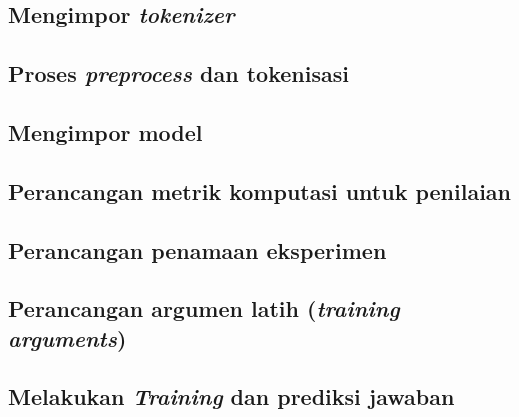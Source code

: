 \subsection{Mengimpor \emph{tokenizer}}

\subsection{Proses \emph{preprocess} dan tokenisasi}

\subsection{Mengimpor model}

\subsection{Perancangan metrik komputasi untuk penilaian}

\subsection{Perancangan penamaan eksperimen}

\subsection{Perancangan argumen latih (\emph{training arguments})}

\subsection{Melakukan \emph{Training} dan prediksi jawaban}


